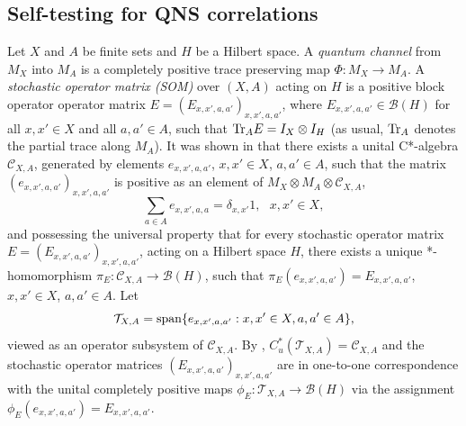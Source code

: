 \documentclass[11pt]{amsart}
\theoremstyle{definition}
\newcommand{\cl}[1]{\mathcal{#1}}
\begin{document}

\subsection{Self-testing for QNS correlations}\label{ss_QNS}


Let $X$ and $A$ be finite sets and $H$ be a Hilbert space. 
A \emph{quantum channel} from $M_X$ into $M_A$ is a completely positive trace preserving map
$\Phi : M_X\to M_A$.
A \emph{stochastic operator matrix (SOM)} over $(X,A)$ acting on $H$
is a positive block operator operator matrix $E = (E_{x,x',a,a'})_{x,x',a,a'}$, 
where $E_{x,x',a,a'}\in \cl B(H)$ for all $x,x'\in X$ and all $a,a'\in A$, 
such that ${\rm Tr}_A E = I_X\otimes I_H$
(as usual, ${\rm Tr}_A$ denotes the partial trace along 
$M_A$). 
It was shown in \cite{tt-QNS} that there exists a unital C*-algebra 
$\cl C_{X,A}$, generated by elements $e_{x,x',a,a'}$, $x,x'\in X$, $a,a'\in A$,
such that the matrix $(e_{x,x',a,a'})_{x,x',a,a'}$ is positive
as an element of $M_X\otimes M_A\otimes \cl C_{X,A}$, 
$$ \sum_{a\in A} e_{x,x',a,a} = \delta_{x,x'} 1, \ \ \ x,x'\in X,$$
and possessing the universal property that for every stochastic operator matrix 
$E = (E_{x,x',a,a'})_{x,x',a,a'}$, acting on a Hilbert space $H$, there exists a unique 
*-homomorphism $\pi_E : \cl C_{X,A}\to \cl B(H)$, such that $\pi_E(e_{x,x',a,a'}) = E_{x,x',a,a'}$, 
$x,x'\in X$, $a,a'\in A$.
Let 
$$ \cl T_{X,A} = {\rm span}\{e_{x,x',a,a'} : x,x'\in X, a,a'\in A\},$$
viewed as an operator subsystem of $\cl C_{X,A}$. 
By
\cite[Corollaries 5.3 and 5.4]{tt-QNS}, $C^*_u(\cl T_{X,A}) = \cl C_{X,A}$ and
the stochastic operator matrices $(E_{x,x',a,a'})_{x,x',a,a'}$
are in one-to-one correspondence with
the unital completely positive maps 
$\phi_E : \cl T_{X,A}\to \cl B(H)$
via the assignment $\phi_E(e_{x,x',a,a'}) =  E_{x,x',a,a'}$. 
\end{document}
